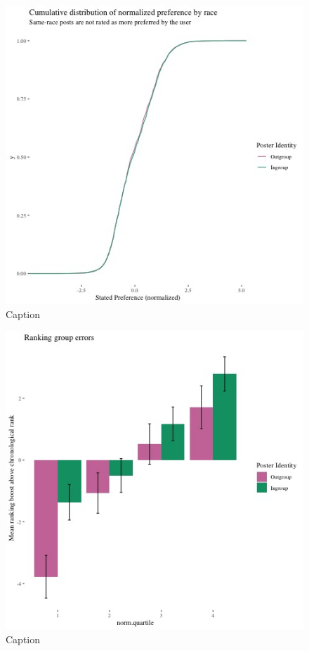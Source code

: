 \documentclass[12pt,letterpaper]{article}
\begin{document}
\begin{figure}[!h]
    \centering
    \includegraphics[scale=0.5]{Output/Graphs/Audit/Stated preferences/US NF cdf norm preferences by ingroup.jpg}
    \caption{Caption}
    \label{fig:prefcdf}
\end{figure}

\begin{figure}[!h]
    \centering
    \includegraphics[scale=0.75]{Output/Graphs/Audit/Misranking relative to expectation/Chronological expectation/US NF by norm preference.jpg}
    \caption{Caption}
    \label{fig:rankabovetime}
\end{figure}
\end{document}
